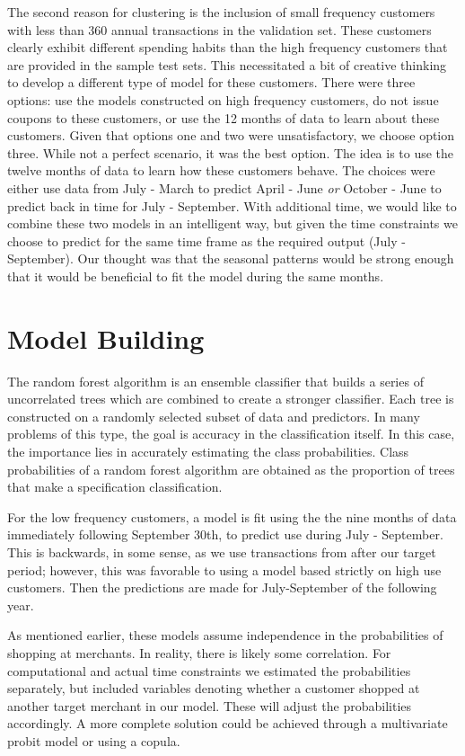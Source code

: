 \documentclass[12pt]{article} %
\begin{document}
The second reason for clustering is the inclusion of small frequency customers with less than 360 annual transactions in the validation set.  These customers clearly exhibit different spending habits than the high frequency customers that are provided in the sample test sets.  This necessitated a bit of creative thinking to develop a different type of model for these customers.  There were three options: use the models constructed on high frequency customers, do not issue coupons to these customers, or use the 12 months of data to learn about these customers.  Given that options one and two were unsatisfactory, we choose option three.  While not a perfect scenario, it was the best option.   The idea is to use the twelve months of data to learn how these customers behave.  The choices were either use data from July - March to predict April - June \emph{or}  October - June to predict back in time for July - September.  With additional time, we would like to combine these two models in an intelligent way, but given the time constraints we choose to predict for the same time frame as the required output (July - September).  Our thought was that the seasonal patterns would be strong enough that it would be beneficial to fit the model during the same months.

\section{Model Building}
The random forest algorithm is an ensemble classifier that builds a series of uncorrelated trees which are combined to create a stronger classifier.  Each tree is constructed on a randomly selected subset of data and predictors.  In many problems of this type, the goal is accuracy in the classification itself.  In this case, the importance lies in accurately estimating the class probabilities.  Class probabilities of a random forest algorithm are obtained as the proportion of trees that make a specification classification.

For the low frequency customers, a model is fit using the the nine months of data immediately following September 30th, to predict use during July - September.  This is backwards, in some sense, as we use transactions from after our target period; however, this was favorable to using a model based strictly on high use customers.  Then the predictions are made for July-September of the following year.

As mentioned earlier, these models assume independence in the probabilities of shopping at merchants.  In reality, there is likely some correlation.  For computational and actual time constraints we estimated the probabilities separately, but included variables denoting whether a customer shopped at another target merchant in our model.  These will adjust the probabilities accordingly.  A more complete solution could be achieved through a multivariate probit model or using a copula.
\end{document}
